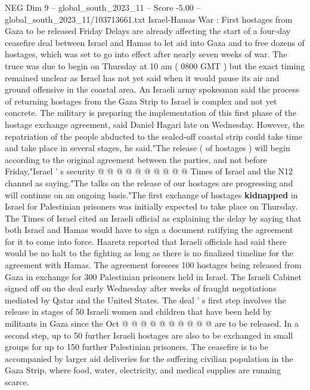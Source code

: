 \begin{textsample}{NEG Dim 9 – global\_south\_2023\_11 – Score -5.00 – global\_south\_2023\_11/103713661.txt}  \label{ex:f9_neg_318}
Israel-Hamas War : First hostages from Gaza to be released Friday Delays are already affecting the start of a four-day ceasefire deal between Israel and Hamas to let aid into Gaza and to free dozens of hostages, which was set to go into effect after nearly seven weeks of war.
The truce was due to begin on Thursday at 10 am ( 0800 GMT ) but the exact timing remained unclear as Israel has not yet said when it would pause its air and ground offensive in the coastal area.
An Israeli army spokesman said the process of returning hostages from the Gaza Strip to Israel is complex and not yet concrete.
The military is preparing the implementation of this first phase of the hostage exchange agreement, said Daniel Hagari late on Wednesday.
However, the repatriation of the people abducted to the sealed-off coastal strip could take time and take place in several stages, he said."The release ( of hostages ) will begin according to the original agreement between the parties, and not before Friday,"Israel ' s security @ @ @ @ @ @ @ @ @ @ Times of Israel and the N12 channel as saying."The talks on the release of our hostages are progressing and will continue on an ongoing basis."The first exchange of hostages \textbf{kidnapped} in Israel for Palestinian prisoners was initially expected to take place on Thursday.
The Times of Israel cited an Israeli official as explaining the delay by saying that both Israel and Hamas would have to sign a document ratifying the agreement for it to come into force.
Haaretz reported that Israeli officials had said there would be no halt to the fighting as long as there is no finalized timeline for the agreement with Hamas.
The agreement foresees 100 hostages being released from Gaza in exchange for 300 Palestinian prisoners held in Israel.
The Israeli Cabinet signed off on the deal early Wednesday after weeks of fraught negotiations mediated by Qatar and the United States.
The deal ' s first step involves the release in stages of 50 Israeli women and children that have been held by militants in Gaza since the Oct @ @ @ @ @ @ @ @ @ @ are to be released.
In a second step, up to 50 further Israeli hostages are also to be exchanged in small groups for up to 150 further Palestinian prisoners.
The ceasefire is to be accompanied by larger aid deliveries for the suffering civilian population in the Gaza Strip, where food, water, electricity, and medical supplies are running scarce.

\end{textsample}
